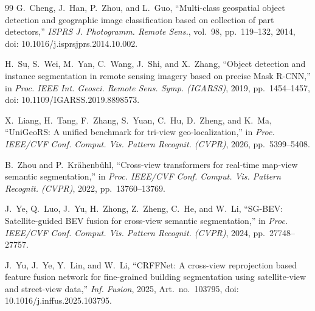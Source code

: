 \documentclass[letterpaper,journal]{IEEEtran}
\begin{document}
\begin{thebibliography}{99}
G.~Cheng, J.~Han, P.~Zhou, and L.~Guo, ``Multi-class geospatial object detection and geographic image classification based on collection of part detectors,'' \textit{ISPRS J. Photogramm. Remote Sens.}, vol.~98, pp.~119--132, 2014, doi: 10.1016/j.isprsjprs.2014.10.002.

H.~Su, S.~Wei, M.~Yan, C.~Wang, J.~Shi, and X.~Zhang, ``Object detection and instance segmentation in remote sensing imagery based on precise Mask R-CNN,'' in \textit{Proc. IEEE Int. Geosci. Remote Sens. Symp. (IGARSS)}, 2019, pp.~1454--1457, doi: 10.1109/IGARSS.2019.8898573.

X.~Liang, H.~Tang, F.~Zhang, S.~Yuan, C.~Hu, D.~Zheng, and K.~Ma, ``UniGeoRS: A unified benchmark for tri-view geo-localization,'' in \textit{Proc. IEEE/CVF Conf. Comput. Vis. Pattern Recognit. (CVPR)}, 2026, pp.~5399--5408.

B.~Zhou and P.~Kr\"ahenb\"uhl, ``Cross-view transformers for real-time map-view semantic segmentation,'' in \textit{Proc. IEEE/CVF Conf. Comput. Vis. Pattern Recognit. (CVPR)}, 2022, pp.~13760--13769.

J.~Ye, Q.~Luo, J.~Yu, H.~Zhong, Z.~Zheng, C.~He, and W.~Li, ``SG-BEV: Satellite-guided BEV fusion for cross-view semantic segmentation,'' in \textit{Proc. IEEE/CVF Conf. Comput. Vis. Pattern Recognit. (CVPR)}, 2024, pp.~27748--27757.

J.~Yu, J.~Ye, Y.~Lin, and W.~Li, ``CRFFNet: A cross-view reprojection based feature fusion network for fine-grained building segmentation using satellite-view and street-view data,'' \textit{Inf. Fusion}, 2025, Art.~no.~103795, doi: 10.1016/j.inffus.2025.103795.

\end{thebibliography}


\vfill
\end{document}
